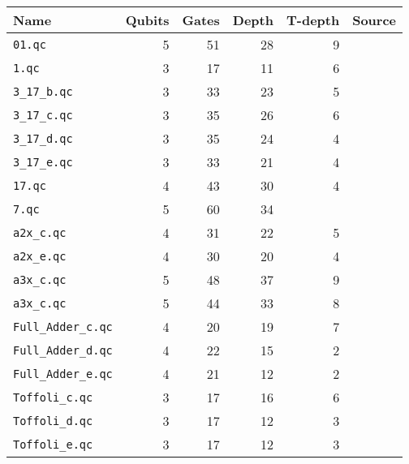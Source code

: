 \documentclass{article}
\begin{document}
\begin{tabular}{|l|r|r|r|r|c|}
   \hline
   Name & Qubits & Gates & Depth & T-depth & Source \\ \hline  \hline
   {\tt 01.qc} & 5 & 51 & 28 & 9 & \cite{Qbench}  \\  \hline
   
   {\tt 1.qc} & 3 & 17 & 11 & 6 & \cite{Qbench}  \\  \hline
   
    {\tt 3\_17\_b.qc} & 3 & 33 & 23 & 5 & \cite{DBLP:conf/rc/MillerSD14}  \\  \hline
    {\tt 3\_17\_c.qc} & 3 & 35 & 26 & 6 & \cite{DBLP:conf/rc/MillerSD14}  \\  \hline
    {\tt 3\_17\_d.qc} & 3 & 35 & 24 & 4 & \cite{DBLP:conf/rc/MillerSD14}  \\  \hline
    {\tt 3\_17\_e.qc} & 3 & 33 & 21 & 4 & \cite{DBLP:conf/rc/MillerSD14}  \\  \hline
    
    {\tt 17.qc} & 4 & 43 & 30 & 4 & \cite{Qbench}  \\  \hline
    
     {\tt 7.qc} & 5 & 60 & 34 &  & \cite{Qbench}  \\  \hline
    
    {\tt a2x\_c.qc} & 4 & 31 & 22 & 5 & \cite{DBLP:conf/rc/MillerSD14}  \\  \hline
    {\tt a2x\_e.qc} & 4 & 30 & 20 & 4 & \cite{DBLP:conf/rc/MillerSD14}  \\  \hline
    
    {\tt a3x\_c.qc} & 5 & 48 & 37 & 9 & \cite{DBLP:conf/rc/MillerSD14}  \\  \hline
    {\tt a3x\_c.qc} & 5 & 44 & 33 & 8 & \cite{DBLP:conf/rc/MillerSD14}  \\  \hline
    
   {\tt Full\_Adder\_c.qc} & 4 & 20 & 19 & 7 & \cite{DBLP:conf/rc/MillerSD14}  \\  \hline
   {\tt Full\_Adder\_d.qc} & 4 & 22 & 15 & 2 & \cite{DBLP:conf/rc/MillerSD14}  \\  \hline
   {\tt Full\_Adder\_e.qc} & 4 & 21 & 12 & 2 & \cite{DBLP:conf/rc/MillerSD14}  \\  \hline
   
   {\tt Toffoli\_c.qc} & 3 & 17 & 16 & 6 & \cite{DBLP:conf/rc/MillerSD14}  \\  \hline
   {\tt Toffoli\_d.qc} & 3 & 17 & 12 & 3 & \cite{DBLP:conf/rc/MillerSD14}  \\  \hline
   {\tt Toffoli\_e.qc} & 3 & 17 & 12 & 3 & \cite{DBLP:conf/rc/MillerSD14}  \\  \hline
  \end{tabular} 
  \vspace{5mm}
  
\end{document}
